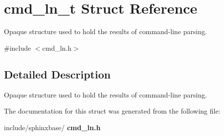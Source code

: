 \section{cmd\+\_\+ln\+\_\+t Struct Reference}
\label{structcmd__ln__t}


Opaque structure used to hold the results of command-\/line parsing.  




{\ttfamily \#include $<$cmd\+\_\+ln.\+h$>$}



\subsection{Detailed Description}
Opaque structure used to hold the results of command-\/line parsing. 

The documentation for this struct was generated from the following file\+:\begin{DoxyCompactItemize}
\item 
include/sphinxbase/\textbf{ cmd\+\_\+ln.\+h}\end{DoxyCompactItemize}
